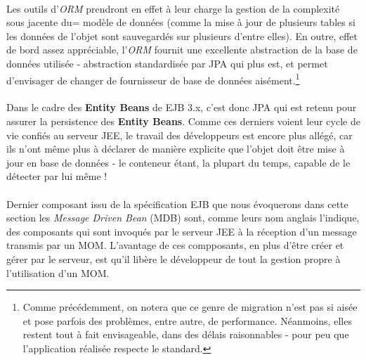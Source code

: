 {  \paragraph{} Les outils d'\textit{ORM} prendront en effet à leur charge la gestion de la complexité
  sous jacente du= modèle de données (comme la mise à jour de plusieurs tables si les données de l'objet
  sont sauvegardés sur plusieurs d'entre elles). En outre, effet de bord assez appréciable,
  l'\textit{ORM} fournit une excellente abstraction de la base de données utilisée - abstraction
  standardisée par JPA qui plus est, et permet d'envisager de changer de fournisseur de base de
  données aisément.\footnote{Comme précédemment, on notera que ce genre de migration n'est pas si
  aisée et pose parfois des problèmes, entre autre, de performance. Néanmoins, elles restent tout à
  fait envisageable, dans des délais raisonnables - pour peu que l'application réalisée respecte le
  standard.}

  \paragraph{} Dans le cadre des \textbf{Entity Beans} de EJB 3.x, c'est donc JPA qui est retenu
  pour assurer la persistence des \textbf{Entity Beans}. Comme ces derniers voient leur cycle de vie
  confiés au serveur JEE, le travail des développeurs est encore plus allégé, car ils n'ont même
  plus à déclarer de manière explicite que l'objet doit être mise à jour en base de données - le
  conteneur étant, la plupart du temps, capable de le détecter par lui même !


  \paragraph{} Dernier composant issu de la spécification EJB que nous évoquerons dans cette section
  les \textit{Message Driven Bean} (MDB) sont, comme leurs nom anglais l'indique, des composants qui sont
  invoqués par le serveur JEE à la réception d'un message transmis par un MOM. L'avantage de ces
  compposants, en plus d'être créer et gérer par le serveur, est qu'il libère le développeur de tout
  la gestion propre à l'utilisation d'un MOM.

}

